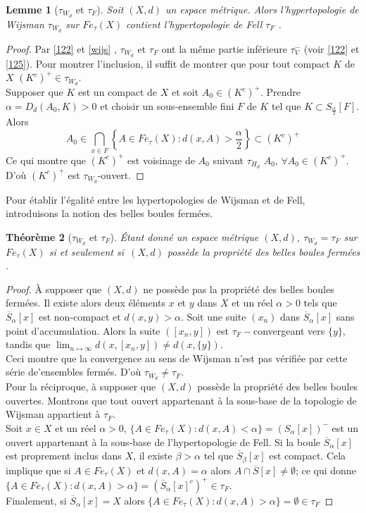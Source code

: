 \documentclass[11pt]{report}
\newenvironment{boxtheorem}
{\begin{tcolorbox}
		[enhanced jigsaw,breakable,pad at break*=2mm,
		colback=black!5,colframe=bleueLeger]}
	{\end{tcolorbox}}
\theoremstyle{styletheorem}
\newtheorem{theoreme}{Théorème}[section]
\newtheorem{lemma}[theoreme]{Lemme}
\newenvironment{theorem}
{\vspace*{0.3cm}\begin{boxtheorem}\begin{theoreme}}{\end{theoreme}\end{boxtheorem}\vspace*{0.3cm}}
\theoremstyle{styledef}
\theoremstyle{remark}
\newenvironment{lemme}
{\vspace*{0.3cm}\begin{boxtheorem}\begin{lemma}}{\end{lemma}\end{boxtheorem}\vspace*{0.3cm}}
\newcommand{\ssi}{si et seulement si\  }
\newcommand{\Fe}{\ensuremath{Fe_{\tau}(X)}}
\begin{document}
	\begin{lemme}[$\tau_{W_d}$ et  $\tau_F$]
		Soit $(X,d)$ un espace métrique. Alors l'hypertopologie de Wijsman $\tau_{W_d}$ sur $\Fe$ contient l'hypertopologie de Fell $\tau_F$ \cite{b9}.	
	\end{lemme}
	\begin{proof}
		Par \ref{122} et \ref{wijs} , $\tau_{W_d}$ et $\tau_F$ ont la même partie inférieure $\tau_V^-$ (voir \ref{122} et \ref{125}). Pour montrer l'inclusion, il suffit de montrer que pour tout compact $K$ de $X$ $(K^c)^+ \in \tau_{W_d}$.\\
		Supposer que $K$ est un compact de $X$ et soit $A_0 \in (K^c)^+$. Prendre $\alpha = D_d (A_0,K) >0$ et choisir un sous-ensemble fini $F$ de $K$ tel que $K \subset S_{\frac{\alpha}{2}} [F]$. Alors $$A_0 \in \bigcap_{x \in F} \left\lbrace A \in \Fe \colon d(x,A)> \frac{\alpha}{2} \right\rbrace \subset (K^c)^+$$ 
		Ce qui montre que $(K^c)^+$ est voisinage de $A_0$ suivant $\tau_{H_d}$ $A_0$, $\forall A_0 \in (K^c)^+$. D'où $(K^c)^+$ est $\tau_{W_d}$-ouvert. 
	\end{proof}
	Pour établir l'égalité entre les hypertopologies de Wijsman et de Fell, introduisons la notion des belles boules fermées.
	\begin{theorem}[$\tau_{W_d}$ et  $\tau_F$]\label{wijs2}
		Étant donné un espace métrique $(X,d)$, $\tau_{W_d} = \tau_F$ sur $\Fe$ \ssi $(X,d)$ possède la propriété des belles boules fermées \cite{b8}.
	\end{theorem}
	\begin{proof}
		À supposer que $(X,d)$ ne possède pas la propriété des belles boules fermées. Il existe alors deux éléments $x$ et $y$ dans $X$ et un réel $\alpha >0$ tels que 
		$\overline{S}_\alpha [x]$ est non-compact et $d(x,y)>\alpha$. Soit une suite $(x_n)$ dans $\overline{S}_\alpha [x]$ sans point d'accumulation. Alors  la suite $([x_n,y]) $ est $\tau_F-$convergeant vers $\lbrace y \rbrace$, tandis que $\lim_{n\mapsto \infty} d(x,[x_n,y]) \neq d(x,\lbrace y \rbrace)$.\\
		Ceci montre que la convergence au sens de Wijsman n'est pas vérifiée par cette série de'ensembles fermés. D'où $\tau_{W_d} \neq \tau_F$.\\
		
		Pour la réciproque, à supposer que $(X,d)$ possède la propriété des belles boules ouvertes. Montrons que tout ouvert appartenant à la sous-base de la topologie de Wijsman appartient à $\tau_F$.\\
		Soit $x \in X$ et un réel $\alpha>0$, $\lbrace A \in \Fe \colon d(x,A)<\alpha \rbrace= (S_\alpha [x])^-$ est un ouvert appartenant à la sous-base de l'hypertopologie de Fell. Si la boule $\overline{S}_\alpha [x]$ est proprement inclus dans $X$, il existe $\beta > \alpha$ tel que $\overline{S}_\beta [x]$ est compact. Cela implique que si $A \in \Fe$ et $d(x,A) = \alpha$ alors $A \cap \overline{S}[x] \neq \emptyset$; ce qui donne $\lbrace A \in \Fe \colon d(x,A) >\alpha \rbrace = (\overline{S}_\alpha [x]^c)^+ \in \tau_F$.\\
		Finalement, si $\overline{S}_\alpha [x] = X$ alors $\lbrace A \in \Fe \colon d(x,A) >\alpha \rbrace = \emptyset \in \tau_F  $
	\end{proof}
\end{document}
